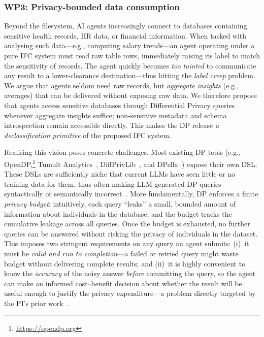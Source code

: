 \documentclass{kaw}
\begin{document}
\subsubsection{WP3: Privacy-bounded data consumption}
%
Beyond the filesystem, AI agents increasingly connect to databases containing
sensitive health records, HR data, or financial information.
%
When tasked with analysing such data---e.g., computing salary trends---an agent
operating under a pure IFC system must read raw table rows, immediately raising
its label to match the sensitivity of records. 
%
The agent quickly becomes \emph{too tainted} to communicate any result to a
lower-clearance destination---thus hitting the \emph{label creep} problem.
%
We argue that agents seldom need raw records, but 
\emph{aggregate insights} (e.g., averages) that can be delivered
without exposing raw data.
%
We therefore propose that agents access sensitive databases through
Differential Privacy queries whenever aggregate insights suffice;
non-sensitive metadata and schema introspection remain accessible directly.
%
%
This makes the DP release \emph{a declassification primitive} of the proposed IFC
system.

Realising this vision poses concrete challenges.
%
Most existing DP tools (e.g., OpenDP,\footnote{\url{https://opendp.org}} Tumult Analytics~\cite{TumultAnalytics:VLDB23}, DiffPrivLib~\cite{Holohan:DiffPrivLib:19}, and DPella~\cite{LoboVesga:SP20}) expose their own
DSL. 
%
These DSLs are sufficiently niche that current LLMs have seen little
or no training data for them, thus often making LLM-generated DP queries
syntactically or semantically incorrect~\cite{Gu:DSLCodeGen:TOSEM25,Joel:LRPLSurvey:TOSEM25}.
%
More fundamentally, DP enforces a finite \emph{privacy budget}:
intuitively, each query ``leaks'' a small, bounded amount of information about
individuals in the database, and the budget tracks the cumulative leakage
across all queries.
%
Once the budget is exhausted, no further queries can be answered without
risking the privacy of individuals in the dataset.
%
This imposes two stringent requirements on any query an agent submits: (i)~it
must be \emph{valid and run to completion}---a failed or retried query might
waste budget without delivering complete results; and (ii)~it is highly
convenient to know the \emph{accuracy} of the noisy answer \emph{before}
committing the query, so the agent can make an informed cost--benefit
decision about whether the result will be useful enough to justify the
privacy expenditure---a problem directly targeted by the PI's prior
work~\cite{LoboVesga:SP20,LoboVesga:TOPLAS21,Russo:CCS25}.
%
\end{document}
